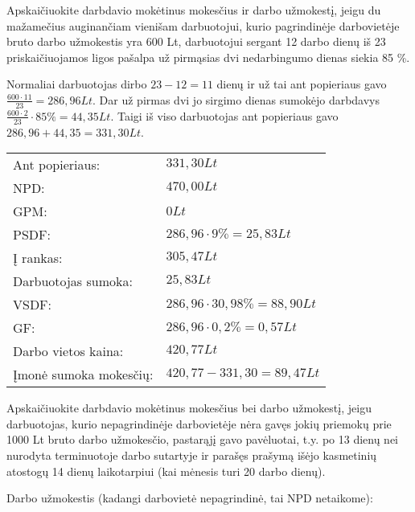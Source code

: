 \begin{tasks}
  \begin{task}
    \begin{condition}
      Apskaičiuokite darbdavio mokėtinus mokesčius ir darbo
      užmokestį, jeigu du mažamečius auginančiam vienišam
      darbuotojui, kurio pagrindinėje darbovietėje bruto darbo
      užmokestis yra 600 Lt, darbuotojui sergant 12 darbo dienų iš 23
      priskaičiuojamos ligos pašalpa už pirmąsias dvi nedarbingumo
      dienas siekia 85 \%.
    \end{condition}
    \begin{solution}
      Normaliai darbuotojas dirbo $23 - 12 = 11$ dienų ir už tai
      ant popieriaus gavo $\frac{600 \cdot 11}{23} = 286,96 Lt$.
      Dar už pirmas dvi jo sirgimo dienas sumokėjo darbdavys
      $\frac{600 \cdot 2}{23} \cdot 85\% = 44,35 Lt$.
      Taigi iš viso darbuotojas ant popieriaus gavo
      $286,96 + 44,35 = 331,30 Lt$.

      \begin{tabularx}{15cm}{p{7.5cm}|p{7.5cm}}
        Ant popieriaus: & $331,30Lt$ \\
        NPD: & $470,00Lt$ \\
        GPM: & $0Lt$ \\
        PSDF: & $286,96 \cdot 9\% = 25,83Lt$ \\
        Į rankas: & $305,47Lt$ \\
        Darbuotojas sumoka: & $25,83Lt$ \\
        VSDF: & $286,96 \cdot 30,98\% = 88,90Lt$ \\
        GF: & $286,96 \cdot 0,2\% = 0,57Lt$ \\
        Darbo vietos kaina: & $420,77Lt$ \\
        Įmonė sumoka mokesčių: & $420,77 - 331,30 = 89,47Lt$ \\
      \end{tabularx}

    \end{solution}
  \end{task}

  \begin{task}
    \begin{condition}
      Apskaičiuokite darbdavio mokėtinus mokesčius bei darbo
      užmokestį, jeigu darbuotojas, kurio nepagrindinėje
      darbovietėje nėra gavęs jokių priemokų prie 1000 Lt bruto
      darbo užmokesčio, pastarąjį gavo pavėluotai, t.y. po 13
      dienų nei nurodyta terminuotoje darbo sutartyje ir parašęs
      prašymą išėjo kasmetinių atostogų 14 dienų laikotarpiui
      (kai mėnesis turi 20 darbo dienų).
    \end{condition}
    \begin{solution}
      Darbo užmokestis (kadangi darbovietė nepagrindinė, tai
      NPD netaikome):


\end{solution}
\end{task}
\end{tasks}
